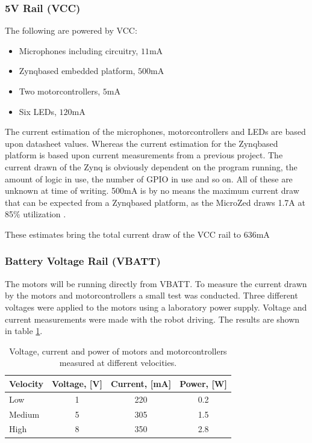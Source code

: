 \subsubsection*{5V Rail (VCC)} %

The following are powered by VCC:
\begin{itemize}
	\item Microphones including circuitry, $11$mA
	\item Zynqbased embedded platform, $500$mA
	\item Two motorcontrollers, $5$mA
	\item Six LEDs, $120$mA
\end{itemize}
The current estimation of the microphones, motorcontrollers and LEDs are based upon datasheet values. 
Whereas the current estimation for the Zynqbased platform is based upon current measurements from a previous project.
The current drawn of the Zynq is obviously dependent on the program running, the amount of logic in use, the number of GPIO in use and so on. All of these are unknown at time of writing.
500mA is by no means the maximum current draw that can be expected from a Zynqbased platform, as the MicroZed draws 1.7A at 85\% utilization \cite{microzed_hardware_guide}.

These estimates bring the total current draw of the VCC rail to $636$mA

\subsubsection*{Battery Voltage Rail (VBATT)} %

The motors will be running directly from VBATT.
To measure the current drawn by the motors and motorcontrollers a small test was conducted.
Three different voltages were applied to the motors using a laboratory power supply. 
Voltage and current measurements were made with the robot driving. 
The results are shown in table \ref{tab:motor_power}.

\begin{table}[h]
\centering
\caption{Voltage, current and power of motors and motorcontrollers measured at different velocities.}
\label{tab:motor_power}
\begin{tabular}{|l|c|c|c|}
\hline
\textbf{Velocity} & Voltage, [V]   & Current, [mA] & Power, [W]      \\ \hline
Low     	& 1  & 220 & 0.2 \\ \hline
Medium 		& 5  & 305 & 1.5 \\ \hline
High        & 8  & 350 & 2.8 \\ \hline
\end{tabular}
\end{table}


